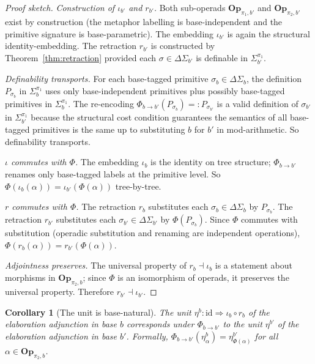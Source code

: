 \documentclass[11pt]{article}
\newtheorem{corollary}{Corollary}
\begin{document}
\begin{proof}[Proof sketch]
\emph{Construction of $\iota_{b'}$ and $r_{b'}$.} Both sub-operads
$\mathbf{Op}_{\pi_1, b'}$ and $\mathbf{Op}_{\pi_2, b'}$ exist by
construction (the metaphor labelling is base-independent and the
primitive signature is base-parametric). The embedding $\iota_{b'}$
is again the structural identity-embedding. The retraction $r_{b'}$
is constructed by Theorem~\ref{thm:retraction} provided each
$\sigma \in \Delta\Sigma_{b'}$ is definable in $\Sigma^{\pi_1}_{b'}$.

\emph{Definability transports.} For each base-tagged primitive
$\sigma_b \in \Delta\Sigma_b$, the definition $P_{\sigma_b}$ in
$\Sigma^{\pi_1}_b$ uses only base-independent primitives plus
possibly base-tagged primitives in $\Sigma^{\pi_1}_b$. The
re-encoding $\Phi_{b \to b'}(P_{\sigma_b}) =: P_{\sigma_{b'}}$ is
a valid definition of $\sigma_{b'}$ in $\Sigma^{\pi_1}_{b'}$
because the structural cost condition guarantees the semantics of
all base-tagged primitives is the same up to substituting $b$ for
$b'$ in mod-arithmetic. So definability transports.

\emph{$\iota$ commutes with $\Phi$.} The embedding $\iota_b$ is the
identity on tree structure; $\Phi_{b \to b'}$ renames only
base-tagged labels at the primitive level. So
$\Phi(\iota_b(\alpha)) = \iota_{b'}(\Phi(\alpha))$ tree-by-tree.

\emph{$r$ commutes with $\Phi$.} The retraction $r_b$ substitutes
each $\sigma_b \in \Delta\Sigma_b$ by $P_{\sigma_b}$. The retraction
$r_{b'}$ substitutes each $\sigma_{b'} \in \Delta\Sigma_{b'}$ by
$\Phi(P_{\sigma_b})$. Since $\Phi$ commutes with substitution
(operadic substitution and renaming are independent operations),
$\Phi(r_b(\alpha)) = r_{b'}(\Phi(\alpha))$.

\emph{Adjointness preserves.} The universal property of $r_b
\dashv \iota_b$ is a statement about morphisms in
$\mathbf{Op}_{\pi_2, b}$; since $\Phi$ is an isomorphism of
operads, it preserves the universal property. Therefore
$r_{b'} \dashv \iota_{b'}$.
\end{proof}

\begin{corollary}[The unit is base-natural]
The unit $\eta^b : \mathrm{id} \Rightarrow \iota_b \circ r_b$ of the
elaboration adjunction in base $b$ corresponds under $\Phi_{b \to b'}$ to the
unit $\eta^{b'}$ of the elaboration adjunction in base $b'$. Formally,
$\Phi_{b \to b'}(\eta^b_\alpha) = \eta^{b'}_{\Phi(\alpha)}$ for all
$\alpha \in \mathbf{Op}_{\pi_2, b}$.
\end{corollary}
\end{document}
